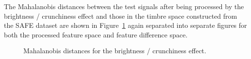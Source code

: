			The Mahalanobis distances between the test signals after being processed by the brightness /
			crunchiness effect and those in the timbre space constructed from the SAFE dataset are shown in
			Figure~\ref{fig:CrunchJeffs} again separated into separate figures for both the processed feature
			space and feature difference space.

			\begin{figure}[h!]
				\centering
				\quad
				\caption{Mahalanobis distances for the brightness / crunchiness effect.}
				\label{fig:CrunchJeffs}
			\end{figure}

